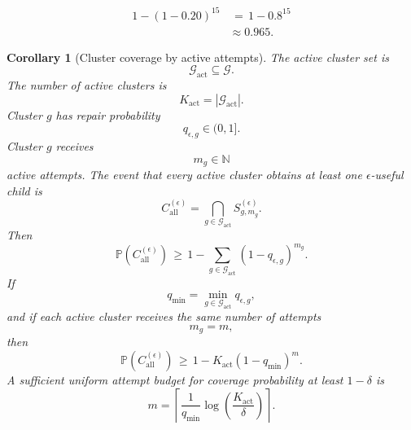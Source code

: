 \documentclass{article} %
\newtheorem{corollary}[theorem]{Corollary}
\begin{document}
\begin{align}
\label{eq:app-third-example-prob}
1-(1-0.20)^{15}
&\,=\,
1-0.8^{15}
\\
&\approx
0.965.
\end{align}

\begin{corollary}[Cluster coverage by active attempts]
\label{cor:app-specialist-coverage}
The active cluster set is
\begin{equation}
\label{eq:app-third-active-clusters}
\mathcal{G}_{\mathrm{act}}
\subseteq
\mathcal{G}.
\end{equation}
The number of active clusters is
\begin{equation}
\label{eq:app-third-active-count}
K_{\mathrm{act}}
=
|\mathcal{G}_{\mathrm{act}}|.
\end{equation}
Cluster \(g\) has repair probability
\begin{equation}
\label{eq:app-third-cluster-q}
q_{\epsilon,g}
\in
(0,1].
\end{equation}
Cluster \(g\) receives
\begin{equation}
\label{eq:app-third-cluster-m}
m_g
\in
\mathbb{N}
\end{equation}
active attempts. The event that every active cluster obtains at least one \(\epsilon\)-useful child is
\begin{equation}
\label{eq:app-third-coverage-event}
C_{\mathrm{all}}^{(\epsilon)}
=
\bigcap_{g\in\mathcal{G}_{\mathrm{act}}}
S_{g,m_g}^{(\epsilon)}.
\end{equation}
Then
\begin{equation}
\label{eq:app-third-coverage-bound}
\mathbb{P}\!\left(
C_{\mathrm{all}}^{(\epsilon)}
\right)
\,\ge\,
1-
\sum_{g\in\mathcal{G}_{\mathrm{act}}}
(1-q_{\epsilon,g})^{m_g}.
\end{equation}
If
\begin{equation}
\label{eq:app-third-qmin}
q_{\min}
=
\min_{g\in\mathcal{G}_{\mathrm{act}}}
q_{\epsilon,g},
\end{equation}
and if each active cluster receives the same number of attempts
\begin{equation}
\label{eq:app-third-uniform-m}
m_g
=
m,
\end{equation}
then
\begin{equation}
\label{eq:app-third-uniform-coverage}
\mathbb{P}\!\left(
C_{\mathrm{all}}^{(\epsilon)}
\right)
\,\ge\,
1-
K_{\mathrm{act}}(1-q_{\min})^{m}.
\end{equation}
A sufficient uniform attempt budget for coverage probability at least \(1-\delta\) is
\begin{equation}
\label{eq:app-third-coverage-complexity}
m
=
\left\lceil
\frac{1}{q_{\min}}
\log\!\left(\frac{K_{\mathrm{act}}}{\delta}\right)
\right\rceil .
\end{equation}
\end{corollary}
\end{document}
